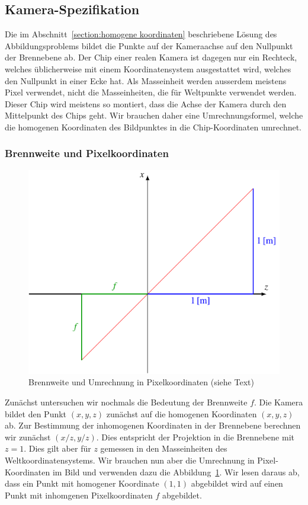 %
%
%
\subsection{Kamera-Spezifikation\label{section:kameraspez}}
Die im Abschnitt~\ref{section:homogene koordinaten} beschriebene
Lösung des Abbildungsproblems bildet die Punkte auf der Kameraachse
auf den Nullpunkt der Brennebene ab.
Der Chip einer realen Kamera ist dagegen nur ein Rechteck, 
welches üblicherweise mit einem Koordinatensystem ausgestattet wird,
welches den Nullpunkt in einer Ecke hat.
Als Masseinheit werden ausserdem meistens Pixel verwendet, nicht die
Masseinheiten, die für Weltpunkte verwendet werden.
Dieser Chip wird meistens so montiert, dass die Achse der Kamera
durch den Mittelpunkt des Chips geht.
Wir brauchen daher eine Umrechnungsformel, welche die homogenen
Koordinaten des Bildpunktes in die Chip-Koordinaten umrechnet.

\subsubsection{Brennweite und Pixelkoordinaten}
\begin{figure}
\centering
\includegraphics{applications/kamera/brennweite.pdf}
\caption{Brennweite und Umrechnung in Pixelkoordinaten (siehe Text)
\label{skript:kamera:brennweite}}
\end{figure}
Zunächst untersuchen wir nochmals die Bedeutung der Brennweite $f$.
Die Kamera bildet den Punkt $(x,y,z)$ zunächst auf die homogenen
Koordinaten $(x,y,z)$ ab.
Zur Bestimmung der inhomogenen Koordinaten in der Brennebene 
berechnen wir zunächst $(x/z, y/z)$.
Dies entspricht der Projektion in die Brennebene mit $z=1$.
Dies gilt aber für $z$ gemessen in den Masseinheiten des
Weltkoordinatensystems.
Wir brauchen nun aber die Umrechnung in Pixel-Koordinaten im Bild
und verwenden dazu die Abbildung~\ref{skript:kamera:brennweite}.
Wir lesen daraus ab, dass ein Punkt mit homogener Koordinate $(1,1)$
abgebildet wird auf einen Punkt mit inhomgenen Pixelkoordinaten $f$
abgebildet.

